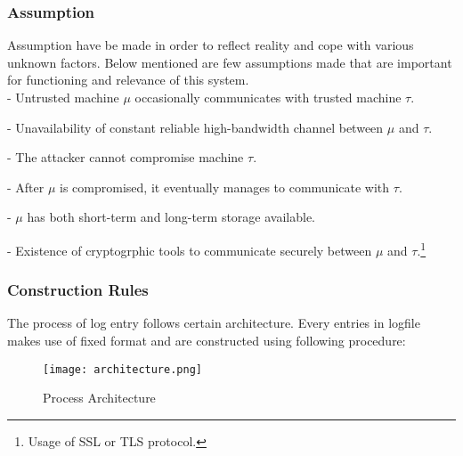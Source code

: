 \documentclass[12pt, letter]{article}
\begin{document}
\subsubsection{Assumption}

Assumption have be made in order to reflect reality and cope with various unknown factors. Below mentioned are few assumptions made that are important for functioning and relevance of this system.\\

- Untrusted machine $\mu$ occasionally communicates with trusted machine $\tau$.

- Unavailability of constant reliable high-bandwidth channel between $\mu$ and $\tau$.

- The attacker cannot compromise machine $\tau$.

- After $\mu$ is compromised, it eventually manages to communicate with $\tau$.

- $\mu$ has both short-term and long-term storage available.

- Existence of cryptogrphic tools to communicate securely between $\mu$ and $\tau$.\footnote{Usage of SSL or TLS protocol.}

\subsubsection{Construction Rules}

The process of log entry follows certain architecture. Every entries in logfile makes use of fixed format and are constructed using following procedure:

\begin{figure}
    \centering
    \texttt{[image: architecture.png]}
    \caption{Process Architecture}
    \label{fig:architecture}
\end{figure}
\end{document}
